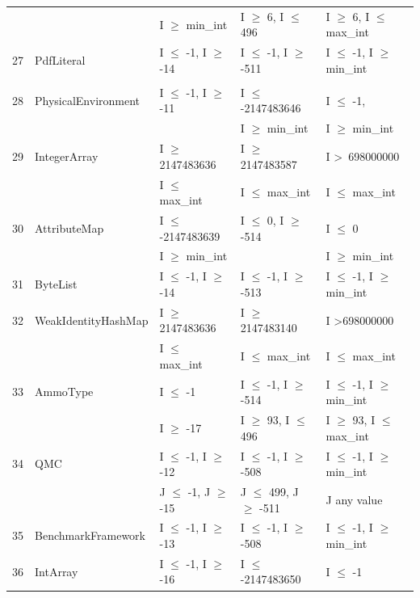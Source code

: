 \documentclass[runningheads,a4paper]{llncs}
\begin{document}
{\begin{longtable}{|l|l|l|l|l|}
	&                                             & I $\ge$ min\_int					& I $\ge$ 6, I $\le$ 496			& I $\ge$ 6,  I $\le$ max\_int	\\	
27	& PdfLiteral					& I $\le$ -1, I $\ge$ -14			& I $\le$ -1, I $\ge$ -511			& I $\le$ -1, I $\ge$ min\_int	\\ 
	&							&								&								&									\\
28	& PhysicalEnvironment		& I $\le$ -1, I $\ge$ -11			& I $\le$ -2147483646			& I $\le$ -1, 							\\ 
	& 							& 								& I $\ge$ min\_int	 			& I $\ge$ min\_int				\\ 
29	& IntegerArray				& I $\ge$ 2147483636			& I $\ge$ 2147483587			& I \textgreater~698000000					\\ 
	&                                             & I $\le$ max\_int					& I $\le$ max\_int					&  I $\le$ max\_int				\\	
30	& AttributeMap				& I $\le$ -2147483639			& I $\le$ 0, I $\ge$ -514			& I $\le$ 0								\\ 
	&                                             & I $\ge$ min\_int					& 								& I $\ge$ min\_int 			   	\\	
31	& ByteList					& I $\le$ -1, I $\ge$ -14			& I $\le$ -1, I $\ge$ -513			& I $\le$ -1, I $\ge$ min\_int	\\ 
32	& WeakIdentityHashMap		& I $\ge$ 2147483636			& I $\ge$ 2147483140			& I \textgreater 698000000					\\ 
	&                                             & I $\le$ max\_int					& I $\le$ max\_int					& I $\le$ max\_int					\\
33	& AmmoType				& I $\le$ -1						& I $\le$ -1, I $\ge$ -514			& I $\le$ -1, I $\ge$ min\_int	\\ 			
	&                                             & I $\ge$ -17					& I $\ge$ 93, I $\le$ 496			& I $\ge$ 93, 	I $\le$ max\_int	\\
34	& QMC						& I $\le$ -1, I $\ge$ -12			& I $\le$ -1, I $\ge$ -508			& I $\le$ -1, I $\ge$ min\_int	\\ 
	&                                             & J $\le$ -1, J $\ge$ -15			& J $\le$ 499, J $\ge$ -511		& J any value			 		  				\\	
35	& BenchmarkFramework		& I $\le$ -1, I $\ge$ -13			& I $\le$ -1, I $\ge$ -508			& I $\le$ -1, I $\ge$ min\_int	\\ 
36	& IntArray					& I $\le$ -1, I $\ge$ -16			& I $\le$ -2147483650			& I $\le$ -1								\\ 

\end{longtable}}
\end{document}

